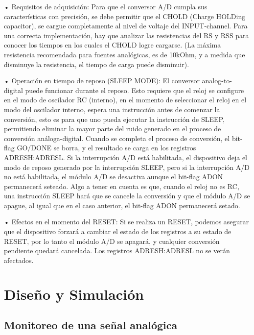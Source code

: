 \documentclass[a4paper]{article}
\newenvironment{ejercicios}
    {\setcounter{secnumdepth}{3}
    \renewcommand\thesubsection{Ejercicio \arabic{subsection}}}
    {\setcounter{secnumdepth}{0}}
\begin{document}
\begin{Conceptos}
	• Requisitos de adquisición:
	Para que el conversor A/D cumpla sus características con precisión, se debe
	permitir que el CHOLD (Charge HOLDing capacitor), se cargue completamente
	al nivel de voltaje del INPUT-channel. Para una correcta implementación,
	hay que analizar las resistencias del RS y RSS para conocer los tiempos
	en los cuales el CHOLD logre cargarse.
	(La máxima resistencia recomendada para fuentes analógicas, es de 10kOhm,
	y a medida que disminuye la resistencia, el tiempo de carga puede disminuir).

	• Operación en tiempo de reposo (SLEEP MODE):
	El conversor analog-to-digital puede funcionar durante el reposo. Esto requiere que el
	reloj se configure en el modo de oscilador RC (interno), en el momento de seleccionar el reloj
	en el modo del oscilador interno, espera una instrucción antes de comenzar la conversión,
	esto es para que uno pueda ejecutar la instrucción de SLEEP, permitiendo eliminar la mayor parte
	del ruido generado en el proceso de conversión análoga-digital. Cuando se completa
	el proceso de conversión, el bit-flag GO/DONE se borra, y el resultado se carga en los registros
	ADRESH:ADRESL. Si la interrupción A/D está habilitada, el dispositivo deja el modo de reposo generado
	por la interrupción SLEEP, pero si la interrupción A/D no está habilitada, el módulo A/D se desactiva
	aunque el bit-flag ADON permanecerá seteado. Algo a tener en cuenta es que, cuando el reloj no es RC,
	una instrucción SLEEP hará que se cancele la conversión y que el módulo A/D se apague, al igual que
	en el caso anterior, el bit-flag ADON permanecerá setado.
	
	• Efectos en el momento del RESET:
	Si se realiza un RESET, podemos asegurar que el dispositivo forzará a cambiar el estado de
	los registros a su estado de RESET, por lo tanto el módulo A/D se apagará, y cualquier conversión
	pendiente quedará cancelada. Los registros ADRESH:ADRESL no se verán afectados.
	
\section{Diseño y Simulación}

\begin{ejercicios}

    \subsection{Monitoreo de una señal analógica}\label{ej:monitoreo}


\end{ejercicios}
\end{Conceptos}
\end{document}
